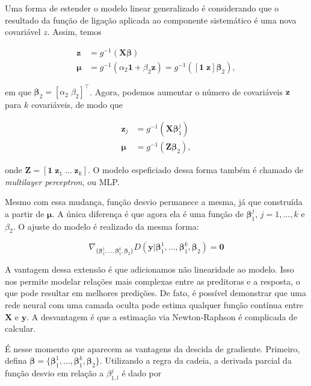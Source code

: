 \documentclass[12pt,]{report}
\begin{document}
Uma forma de estender o modelo linear generalizado é considerando que o
resultado da função de ligação aplicada ao componente sistemático é uma
nova covariável \(z\). Assim, temos

\[
\begin{aligned}
\mathbf z &= g^{-1}(\mathbf X \boldsymbol \beta)\\
\boldsymbol\mu &= g^{-1}(\alpha_2\mathbf 1 + \beta_2 \mathbf z) = g^{-1}([\mathbf 1\;\mathbf z]\boldsymbol\beta_2),
\end{aligned}
\]

em que \(\boldsymbol\beta_2 = [\alpha_2\;\beta_2]^{\top}\). Agora,
podemos aumentar o número de covariáveis \(\mathbf z\) para \(k\)
covariáveis, de modo que

\[
\begin{aligned}
\mathbf z_j &= g^{-1}(\mathbf X \boldsymbol \beta_1^j)\\
\boldsymbol\mu &= g^{-1}(\mathbf Z\boldsymbol\beta_2),
\end{aligned}
\]

onde \(\mathbf Z = [\mathbf 1\;\mathbf z_1\;\dots\;\mathbf z_k]\). O
modelo espeficiado dessa forma também é chamado de \emph{multilayer
perceptron}, ou MLP.

Mesmo com essa mudança, função desvio permanece a mesma, já que
construída a partir de \(\boldsymbol \mu\). A única diferença é que
agora ela é uma função de \(\boldsymbol \beta_1^j\), \(j=1,\dots,k\) e
\(\beta_2\). O ajuste do modelo é realizado da mesma forma:

\[
\nabla_{\{\boldsymbol \beta_1^1, \dots,\boldsymbol \beta_1^k,\boldsymbol \beta_2\}} D(\mathbf y|{ \boldsymbol \beta_1^1, \dots,\boldsymbol \beta_1^k,\boldsymbol \beta_2}) = \mathbf 0
\]

A vantagem dessa extensão é que adicionamos não linearidade ao modelo.
Isso nos permite modelar relações mais complexas entre as preditoras e a
resposta, o que pode resultar em melhores predições. De fato, é possível
demonstrar que uma rede neural com uma camada oculta pode estima
qualquer função contínua entre \(\mathbf X\) e \(\mathbf y\). A
desvantagem é que a estimação via Newton-Raphson é complicada de
calcular.

É nesse momento que aparecem as vantagens da descida de gradiente.
Primeiro, defina
\(\boldsymbol \beta = \{\boldsymbol \beta_1^1, \dots,\boldsymbol \beta_1^k,\boldsymbol \beta_2\}\).
Utilizando a regra da cadeia, a derivada parcial da função desvio em
relação a \(\beta_{1,l}^{j}\) é dado por
\end{document}
